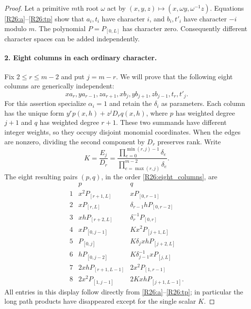\begin{proof}
Let a primitive $m$th root $\omega$ act by
$(x,y,z)\mapsto(x,\omega y,\omega^{-1}z)$.
Equations \eqref{R26:a}--\eqref{R26:tp} show that $a_i,t_i$
have character $i$, and $b_i,t'_i$ have character $-i$ modulo $m$.
The polynomial $P=P_{[0,L]}$ has character zero.
Consequently different character spaces can be added independently.

\paragraph{2. Eight columns in each ordinary character.}
Fix $2\leq r\leq m-2$ and put $j=m-r$.
We will prove that the following eight columns are generically
independent:
\begin{equation}\label{R26:eight_columns}
 xa_r, ya_{r-1}, za_{r+1}, xb_j, yb_{j+1}, zb_{j-1}, t_r, t'_j.
\end{equation}
For this assertion specialize $\alpha_i=1$ and retain the
$\delta_i$ as parameters. Each column has the unique form
$y^r p(x,h)+z^jD_rq(x,h)$, where $p$ has weighted degree $j+1$
and $q$ has weighted degree $r+1$. These two summands have different
integer weights, so they occupy disjoint monomial coordinates.
When the edges are nonzero, dividing the second component by
$D_r$ preserves rank. Write
\begin{equation}\label{R26:K}
 K=\frac{E_j}{D_r}
  =\frac{\prod_{e=0}^{\min(r,j)-1}\delta_e}
         {\prod_{e=\max(r,j)}^{m-2}\delta_e}.
\end{equation}
The eight resulting pairs $(p,q)$, in the order
\eqref{R26:eight_columns}, are
\begin{equation}\label{R26:pair_matrix}
\begin{array}{c|l|l}
 &p&q\\ \hline
1&x^2P_{[r+1,L]}&xP_{[0,r-1]}\\
2&xP_{[r,L]}&\delta_{r-1}hP_{[0,r-2]}\\
3&xhP_{[r+2,L]}&\delta_r^{-1}P_{[0,r]}\\
4&xP_{[0,j-1]}&Kx^2P_{[j+1,L]}\\
5&P_{[0,j]}&K\delta_jxhP_{[j+2,L]}\\
6&hP_{[0,j-2]}&K\delta_{j-1}^{-1}xP_{[j,L]}\\
7&2xhP_{[r+1,L-1]}&2x^2P_{[1,r-1]}\\
8&2x^2P_{[1,j-1]}&2KxhP_{[j+1,L-1]}.
\end{array}
\end{equation}
All entries in this display follow directly from
\eqref{R26:a}--\eqref{R26:tp}; in particular the long path
products have disappeared except for the single scalar $K$.


\end{proof}
